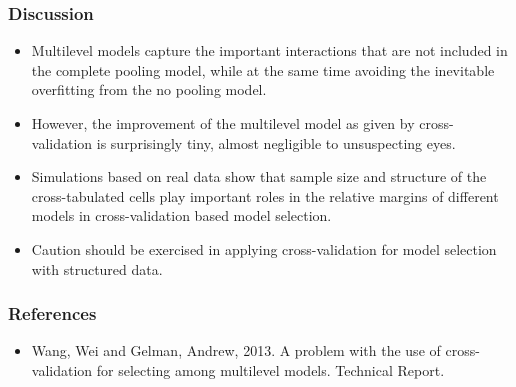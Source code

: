 \documentclass[xetex,mathserif,serif]{beamer}
\begin{document}
\begin{frame}
  \frametitle{Discussion}
  \begin{itemize}
  \item Multilevel models capture the important interactions that are not included
    in the complete pooling model, while at the same time avoiding the inevitable
    overfitting from the no pooling model.  
  \item However, the improvement of the multilevel model as given by
    cross-validation is surprisingly tiny, almost negligible to unsuspecting
    eyes.
  \item Simulations based on real data show that sample size and structure of the
    cross-tabulated cells play important roles in the relative margins of
    different models in cross-validation based model selection.
  \item Caution should be exercised in applying cross-validation for model
    selection with structured data.
  \end{itemize}  
\end{frame}

\begin{frame}
  \frametitle{References}
  \begin{itemize}
  \item Wang, Wei and Gelman, Andrew, 2013. A problem with the use of
    cross-validation for selecting among multilevel models. Technical Report.  
  \end{itemize}
\end{frame}
\end{document}
